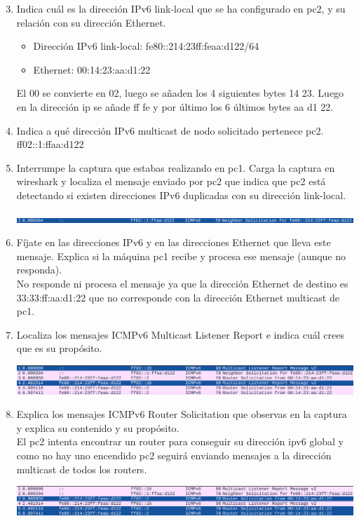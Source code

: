 \documentclass[12pt, a4paper]{report}
\begin{document}
\begin{enumerate}
	\setcounter{enumi}{2}
	\item Indica cuál es la dirección IPv6 link-local que se ha configurado en pc2, y su relación con su
	dirección Ethernet.\\
	\begin{itemize}
		\item Dirección IPv6 link-local: fe80::214:23ff:feaa:d122/64
		\item Ethernet: 00:14:23:aa:d1:22
	\end{itemize}
	El 00 se convierte en 02, luego se añaden los 4 siguientes bytes 14 23. Luego en la dirección ip se añade ff fe y por último los 6 últimos bytes aa d1 22.
	\item Indica a qué dirección IPv6 multicast de nodo solicitado pertenece pc2.\\
	ff02::1:ffaa:d122
	\item Interrumpe la captura que estabas realizando en pc1. Carga la captura en wireshark y localiza
	el mensaje enviado por pc2 que indica que pc2 está detectando si existen direcciones IPv6
	duplicadas con su dirección link-local.
	\begin{center}
		\includegraphics[width=1\textwidth]{ej5_1_1}
	\end{center}
	\item Fíjate en las direcciones IPv6 y en las direcciones Ethernet que lleva este mensaje. Explica si
	la máquina pc1 recibe y procesa ese mensaje (aunque no responda).\\
	
	No responde ni procesa el mensaje ya que la dirección Ethernet de destino es 33:33:ff:aa:d1:22 que no corresponde con la dirección Ethernet multicast de pc1.
	\item Localiza los mensajes ICMPv6 Multicast Listener Report e indica cuál crees que es su propósito.
\begin{center}
		\includegraphics[width=1\textwidth]{ej7_1_1}
\end{center}
	\item Explica los mensajes ICMPv6 Router Solicitation que observas en la captura y explica su
	contenido y su propósito.\\
	
	El pc2 intenta encontrar un router para conseguir su dirección ipv6 global y como no hay uno encendido pc2 seguirá enviando mensajes a la dirección multicast de todos los routers.
\begin{center}
		\includegraphics[width=1\textwidth]{ej8_1_1}
\end{center}
\end{enumerate}
\end{document}
